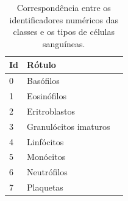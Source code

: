 \documentclass[final,5p]{elsarticle}
\numberwithin{equation}{section}
\begin{document}
    \begin{table}[h]
        \centering
        \begin{tabular}{l l c}
            \toprule
            \textbf{Id} & \textbf{Rótulo} \\
            \midrule
            0 & Basófilos \\
            1 & Eosinófilos \\
            2 & Eritroblastos \\
            3 & Granulócitos imaturos \\
            4 & Linfócitos \\
            5 & Monócitos \\
            6 & Neutrófilos \\
            7 & Plaquetas \\
            \bottomrule
        \end{tabular}
        \caption{Correspondência entre os identificadores numéricos das classes e os tipos de células sanguíneas.}
        \label{tab:rotulos}
    \end{table}
\end{document}
